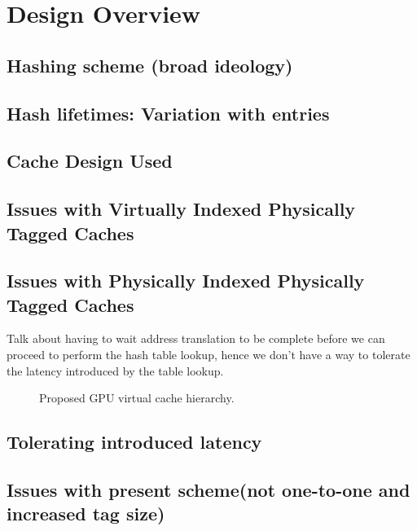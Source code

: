 \section{Design Overview}
\subsection{Hashing scheme (broad ideology)}
\subsection{Hash lifetimes: Variation with entries}
\subsection{Cache Design Used}
\subsection{Issues with Virtually Indexed Physically Tagged Caches}
\subsection{Issues with Physically Indexed Physically Tagged Caches}
Talk about having to wait address translation to be complete before we can 
proceed to perform the hash table lookup, hence we don't have a way to tolerate the latency
introduced by the table lookup. 
\begin{figure}
  \caption{Proposed GPU virtual cache hierarchy.}
  \label{figure:VCDSR_GPU}
\end{figure}
\subsection{Tolerating introduced latency}
\subsection{Issues with present scheme(not one-to-one and increased tag size)}

